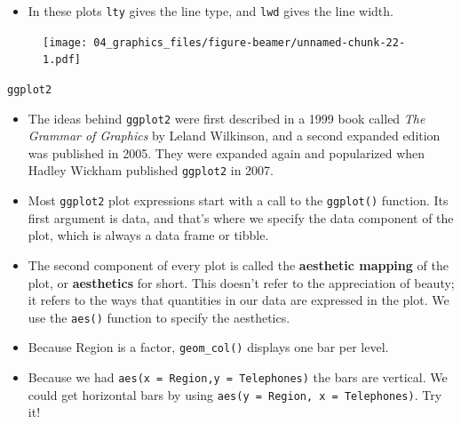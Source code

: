 \documentclass[
  9pt,
  a4paper,
  ignorenonframetext,
  notheorems]{beamer}
\providecommand{\tightlist}{%
  \setlength{\itemsep}{0pt}\setlength{\parskip}{0pt}}\usepackage{longtable,booktabs,array}
\begin{document}
\begin{frame}[fragile]
\begin{itemize}
\tightlist
\item
  In these plots \texttt{lty} gives the line type, and \texttt{lwd}
  gives the line width.
\end{itemize}
\end{frame}

\begin{frame}
\begin{figure}

{\centering \texttt{[image: 04\_graphics\_files/figure-beamer/unnamed-chunk-22-1.pdf]}

}

\end{figure}
\end{frame}

\begin{frame}[fragile]{\texttt{ggplot2}}
\protect\hypertarget{ggplot2}{}
\begin{itemize}
\tightlist
\item
  The ideas behind \texttt{ggplot2} were first described in a 1999 book
  called \emph{The Grammar of Graphics} by Leland Wilkinson, and a
  second expanded edition was published in 2005. They were expanded
  again and popularized when Hadley Wickham published \texttt{ggplot2}
  in 2007.
\end{itemize}

\begin{itemize}
\item
  Most \texttt{ggplot2} plot expressions start with a call to the
  \texttt{ggplot()} function. Its first argument is data, and that's
  where we specify the data component of the plot, which is always a
  data frame or tibble.
\item
  The second component of every plot is called the \textbf{aesthetic
  mapping} of the plot, or \textbf{aesthetics} for short. This doesn't
  refer to the appreciation of beauty; it refers to the ways that
  quantities in our data are expressed in the plot. We use the
  \texttt{aes()} function to specify the aesthetics.
\item
  Because Region is a factor, \texttt{geom\_col()} displays one bar per
  level.
\item
  Because we had \texttt{aes(x\ =\ Region,y\ =\ Telephones)} the bars
  are vertical. We could get horizontal bars by using
  \texttt{aes(y\ =\ Region,\ x\ =\ Telephones)}. Try it!
\end{itemize}
\end{frame}
\end{document}
